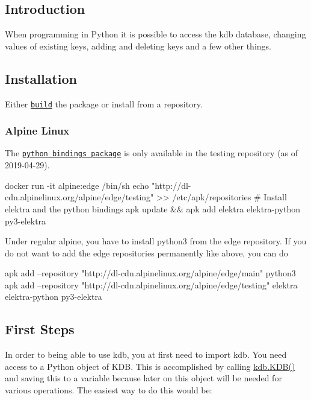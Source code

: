\subsection*{Introduction}

When programming in Python it is possible to access the kdb database, changing values of existing keys, adding and deleting keys and a few other things.

\subsection*{Installation}

Either \href{https://www.libelektra.org/bindings/swig_python}{\tt build} the package or install from a repository.

\subsubsection*{Alpine Linux}

The \href{https://pkgs.alpinelinux.org/packages?name=py3-elektra&branch=edge&repo=testing}{\tt python bindings package} is only available in the testing repository (as of 2019-\/04-\/29).


\begin{DoxyCode}
docker run -it alpine:edge /bin/sh
echo "http://dl-cdn.alpinelinux.org/alpine/edge/testing" >> /etc/apk/repositories
# Install elektra and the python bindings
apk update && apk add elektra elektra-python py3-elektra
\end{DoxyCode}


Under regular alpine, you have to install python3 from the edge repository. If you do not want to add the edge repositories permanently like above, you can do


\begin{DoxyCode}
apk add --repository "http://dl-cdn.alpinelinux.org/alpine/edge/main" python3
apk add --repository "http://dl-cdn.alpinelinux.org/alpine/edge/testing" elektra elektra-python py3-elektra
\end{DoxyCode}


\subsection*{First Steps}

In order to being able to use {\ttfamily kdb}, you at first need to {\ttfamily import kdb}. You need access to a Python object of {\ttfamily K\+DB}. This is accomplished by calling {\ttfamily \hyperlink{classkdb_1_1KDB}{kdb.\+K\+D\+B()}} and saving this to a variable because later on this object will be needed for various operations. The easiest way to do this would be\+:


